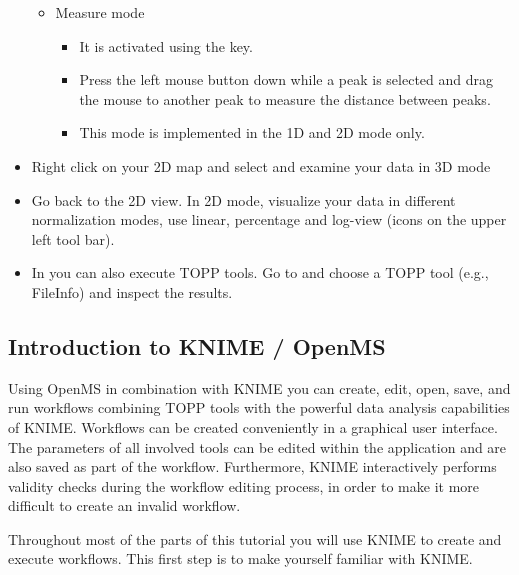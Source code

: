 \begin{itemize}
\begin{itemize}
    \item Measure mode
        \begin{itemize}
        \item It is activated using the \keys{\shift} key.
        \item Press the left mouse button down while a peak is selected and drag the mouse to
        			another peak to measure the distance between peaks.
        \item This mode is implemented in the 1D and 2D mode only.
        \end{itemize}
    \end{itemize}
\item Right click on your 2D map and select  and examine your
			data in 3D mode
\item Go back to the 2D view. In 2D mode, visualize your data in different normalization modes, use linear, percentage and log-view (icons on the upper left tool bar).
\item In  you can also execute TOPP tools. Go to
			 and choose a TOPP tool (e.g., FileInfo) and
			inspect the results.
\end{itemize}


\subsection{Introduction to KNIME / OpenMS}
\label{KNIME_Intro}

Using OpenMS in combination with KNIME you can create, edit, open, save, and run workflows
combining TOPP tools with the powerful data analysis capabilities of KNIME. Workflows can
be created conveniently in a graphical user interface. The parameters of all involved
tools can be edited within the application and are also saved as part of the workflow.
Furthermore, KNIME interactively performs validity checks during the workflow editing
process, in order to make it more difficult to create an invalid workflow.

Throughout most of the parts of this tutorial you will use KNIME to create and
execute workflows. This first step is to make yourself familiar with KNIME.

